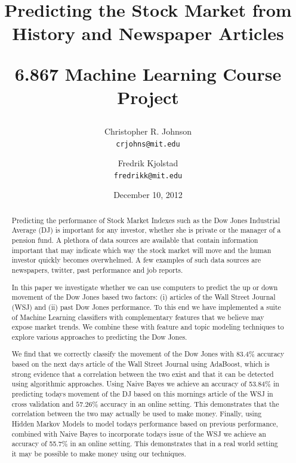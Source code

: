 \documentclass[10pt, twocolumn]{article}
\begin{document}
\title{Predicting the Stock Market from History and Newspaper Articles \\ \begin{large}6.867 Machine Learning Course Project\end{large}}

\author{Christopher R. Johnson  \\ \texttt{crjohns@mit.edu} \and Fredrik Kjolstad \\ \texttt{fredrikk@mit.edu}}
\date{December 10, 2012}
\maketitle

\begin{abstract}
Predicting the performance of Stock Market Indexes such as the Dow Jones Industrial Average (DJ) is important for any investor, whether she is private or the manager of a pension fund.
A plethora of data sources are available that contain information important that may indicate which way the stock market will move and the human investor quickly becomes overwhelmed. A few examples of such data sources are newspapers, twitter, past performance and job reports.

In this paper we investigate whether we can use computers to predict the up or down movement of the Dow Jones based two factors: (i) articles of the Wall Street Journal (WSJ) and (ii) past Dow Jones performance.
To this end we have implemented a suite of Machine Learning classifiers with complementary features that we believe may expose market trends.
We combine these with feature and topic modeling techniques to explore various approaches to predicting the Dow Jones.

We find that we correctly classify the movement of the Dow Jones with 83.4\% accuracy based on the next days article of the Wall Street Journal using AdaBoost, which is strong evidence that a correlation between the two exist and that it can be detected using algorithmic approaches.
Using Naive Bayes we achieve an accuracy of 53.84\% in predicting todays movement of the DJ based on this mornings article of the WSJ in cross validation and $57.26\%$ accuracy in an online setting.
This demonstrates that the correlation between the two may actually be used to make money.
Finally, using Hidden Markov Models to model todays performance based on previous performance, combined with Naive Bayes to incorporate todays issue of the WSJ we achieve an accuracy of 55.7\% in an online setting.
This demonstrates that in a real world setting it may be possible to make money using our techniques.
\end{abstract}
\end{document}
